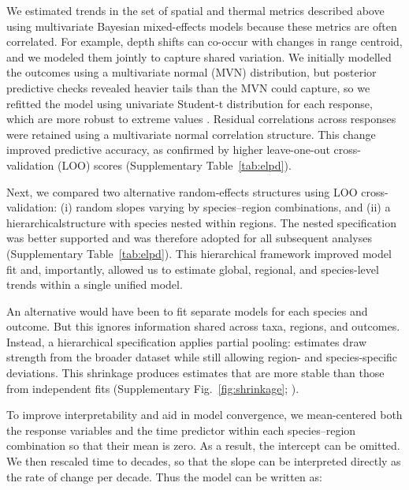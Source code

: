\documentclass[11pt]{article}
\begin{document}
\begin{spacing}{1.5}
We estimated trends in the set of spatial and thermal metrics described above using multivariate Bayesian mixed-effects models because these metrics are often correlated. For example, depth shifts can co-occur with changes in range centroid, and we modeled them jointly to capture shared variation. We initially modelled the outcomes using a multivariate normal (MVN) distribution, but posterior predictive checks revealed heavier tails than the MVN could capture, so we refitted the model using univariate Student-t distribution for each response, which are more robust to extreme values \citep[e.g.,][]{anderson_black-swan_2017}. Residual correlations across responses were retained using a multivariate normal correlation structure. This change improved predictive accuracy, as confirmed by higher leave-one-out cross-validation (LOO) scores \citep{vehtari_practical_2017} (Supplementary Table~\ref{tab:elpd}).

Next, we compared two alternative random-effects structures using LOO cross-validation: (i) random slopes varying by species–region combinations, and (ii) a hierarchicalstructure with species nested within regions. The nested specification was better supported and was therefore adopted for all subsequent analyses (Supplementary Table~\ref{tab:elpd}). This hierarchical framework improved model fit and, importantly, allowed us to estimate global, regional, and species-level trends within a single unified model.

An alternative would have been to fit separate models for each species and outcome. But this ignores information shared across taxa, regions, and outcomes. Instead, a hierarchical specification applies partial pooling: estimates draw strength from the broader dataset while still allowing region- and species-specific deviations. This shrinkage produces estimates that are more stable than those from independent fits (Supplementary Fig.~\ref{fig:shrinkage}; \citealt{mcelreath_statistical_2018}).


To improve interpretability and aid in model convergence, we mean-centered both the response variables and the time predictor within each species–region combination so that their mean is zero. As a result, the intercept can be omitted. We then rescaled time to decades, so that the slope can be interpreted directly as the rate of change per decade.
Thus the model can be written as:


\end{spacing}
\end{document}
